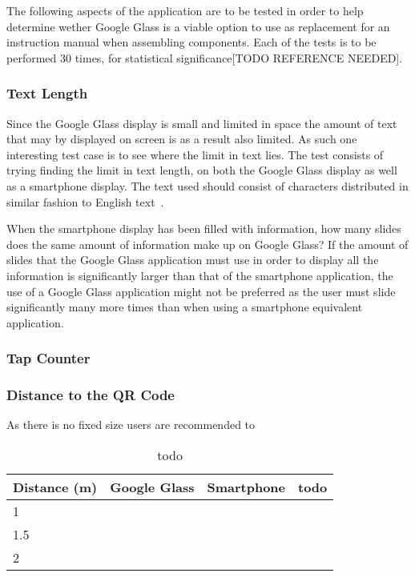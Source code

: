 The following aspects of the application are to be tested in order to help determine wether Google Glass is a viable option to use as replacement for an instruction manual when assembling components. Each of the tests is to be performed 30 times, for statistical significance[TODO REFERENCE NEEDED].

\subsubsection{Text Length}
Since the Google Glass display is small and limited in space the amount of text that may by displayed on screen is as a result also limited. As such one interesting test case is to see where the limit in text lies. The test consists of trying finding the limit in text length, on both the Google Glass display as well as a smartphone display. The text used should consist of characters distributed in similar fashion to English text~\cite{englishTextStat}.

When the smartphone display has been filled with information, how many slides does the same amount of information make up on Google Glass? If the amount of slides that the Google Glass application must use in order to display all the information is significantly larger than that of the smartphone application, the use of a Google Glass application might not be preferred as the user must slide significantly many more times than when using a smartphone equivalent application.

\subsubsection{Tap Counter}


\subsubsection{Distance to the QR Code}
As there is no fixed size users are recommended to 

	\begin{table}[ht!]
    		\caption{todo} \label{tab:distamceAverage}
		\centering \begin{tabularx}{\textwidth}{l|X|X|X} \hline
		\textbf{Distance (m)} & \textbf{Google Glass} & \textbf{Smartphone} & \textbf{todo} \\ \hline \hline
       
		1	&	&	&	\\ \hline
		1.5	&	&	&	\\ \hline
		2	&	&	&	\\ \hline
		
		\end{tabularx}
	\end{table}

